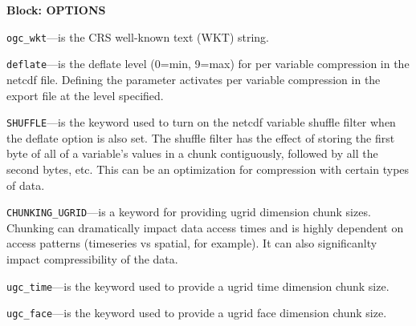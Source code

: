 
\item \textbf{Block: OPTIONS}

\begin{description}
\item \texttt{ogc\_wkt}---is the CRS well-known text (WKT) string.

\item \texttt{deflate}---is the deflate level (0=min, 9=max) for per variable compression in the netcdf file. Defining the parameter activates per variable compression in the export file at the level specified.

\item \texttt{SHUFFLE}---is the keyword used to turn on the netcdf variable shuffle filter when the deflate option is also set. The shuffle filter has the effect of storing the first byte of all of a variable's values in a chunk contiguously, followed by all the second bytes, etc. This can be an optimization for compression with certain types of data.

\item \texttt{CHUNKING\_UGRID}---is a keyword for providing ugrid dimension chunk sizes. Chunking can dramatically impact data access times and is highly dependent on access patterns (timeseries vs spatial, for example). It can also significanlty impact compressibility of the data.

\item \texttt{ugc\_time}---is the keyword used to provide a ugrid time dimension chunk size.

\item \texttt{ugc\_face}---is the keyword used to provide a ugrid face dimension chunk size.

\end{description}

